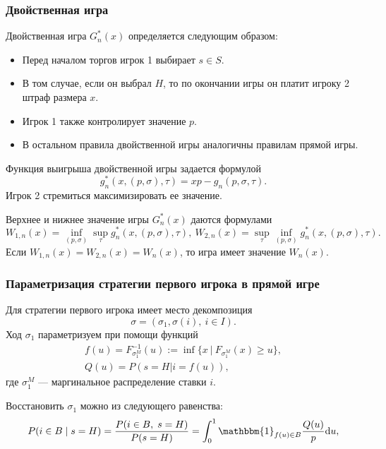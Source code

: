 \documentclass[12pt]{beamer}
\newcommand{\Ind}{\mathbbm{1}}
\newcommand{\di}{\ensuremath{\mathrm{d}}}
\begin{document}
\begin{frame}
  \frametitle{Двойственная игра}
  
  Двойственная игра $G_n^*(x)$ определяется следующим образом:
  \begin{itemize}
  \item 
    Перед началом торгов игрок 1 выбирает $s \in S$.
  \item
    В том случае, если он выбрал $H$, то по окончании игры он платит игроку 2 штраф размера $x$.
  \item
    Игрок 1 также контролирует значение $p$.
  \item
    В остальном правила двойственной игры аналогичны правилам прямой игры.
  \end{itemize}
\end{frame}

\begin{frame}
  Функция выигрыша двойственной игры задается формулой
  \begin{equation*}
    g^*_n(x, (p, \sigma), \tau) = x p - g_n(p, \sigma, \tau).
  \end{equation*}
  Игрок 2 стремиться максимизировать ее значение.

  Верхнее и нижнее значение игры $G^*_n(x)$ даются формулами
  \begin{equation*}
    W_{1,n}(x) = \inf_{(p, \sigma)} \sup_\tau g^*_n(x, (p, \sigma), \tau), \:
    W_{2,n}(x) = \sup_\tau \inf_{(p, \sigma)} g^*_n(x, (p, \sigma), \tau).
  \end{equation*}
  Если $W_{1,n}(x) = W_{2,n}(x) = W_n(x)$, то игра имеет значение $W_n(x)$.
\end{frame}

\begin{frame}
  \frametitle{Параметризация стратегии первого игрока в прямой игре}
  
  Для стратегии первого игрока имеет место декомпозиция 
  \[
    \sigma = (\sigma_1, \sigma(i),\ i \in I).
  \]
  Ход $\sigma_1$ параметризуем при помощи функций
  \begin{gather*}
    f(u) = F^{-1}_{\sigma^M_1}(u) := \inf \{ x\ |\ F_{\sigma^M_1}(x) \geqslant u \},\\
    Q(u) = P(s = H | i = f(u)),
  \end{gather*}
  где $\sigma^M_1$ --- маргинальное распределение ставки $i$.
  
  Восстановить $\sigma_1$ можно из следующего равенства:
  \begin{align*}
    P(i \in B \; | \; s = H) 
    = \frac{P(i \in B, \; s = H)}{P(s = H)}
    = \int_0^1 \Ind_{f(u) \in B} \frac{Q(u)}{p} \di u,
  \end{align*}
\end{frame}
\end{document}
